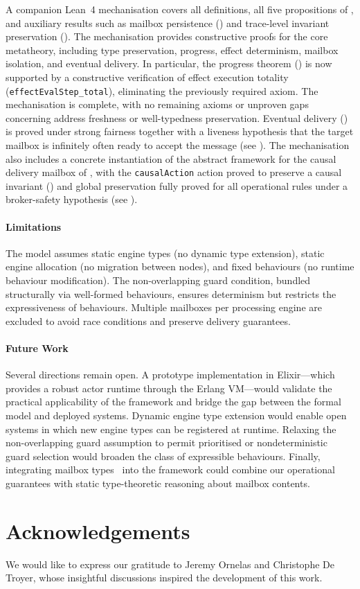 \documentclass[
  a4paper,        %
  techreport,     %
]{art}
\begin{document}
A companion Lean~4 mechanisation covers all definitions, all five
propositions of , and auxiliary results such as
mailbox persistence () and trace-level
invariant preservation ().
The mechanisation provides constructive proofs for the core metatheory,
including type preservation, progress, effect determinism, mailbox isolation,
and eventual delivery.
In particular, the progress theorem () is now supported
by a constructive verification of effect execution totality
(\texttt{effectEvalStep\_total}), eliminating the previously required axiom.
The mechanisation is complete, with no remaining axioms or unproven gaps
concerning address freshness or well-typedness preservation.
Eventual delivery () is proved under
strong fairness together with a liveness hypothesis that the target
mailbox is infinitely often ready to accept the message
(see ).
The mechanisation also includes a concrete instantiation of the
abstract framework for the causal delivery mailbox of
, with the \texttt{causalAction} action
proved to preserve a causal invariant ()
and global preservation fully proved for all operational rules under a
broker-safety hypothesis (see ).

\paragraph{Limitations}
The model assumes static engine types (no dynamic type extension), static
engine allocation (no migration between nodes), and fixed behaviours (no
runtime behaviour modification). The non-overlapping guard condition, bundled
structurally via well-formed behaviours, ensures determinism but restricts the
expressiveness of behaviours. Multiple
mailboxes per processing engine are excluded to avoid race conditions and
preserve delivery guarantees.

\paragraph{Future Work}
Several directions remain open. A prototype implementation in Elixir---which
provides a robust actor runtime through the Erlang VM---would validate the
practical applicability of the framework and bridge the gap between the formal
model and deployed systems. Dynamic engine type extension would enable open
systems in which new engine types can be registered at runtime. Relaxing the
non-overlapping guard assumption to permit prioritised or nondeterministic
guard selection would broaden the class of expressible behaviours. Finally,
integrating mailbox types~\cite{special-delivery-mailbox-types-2023} into the
framework could combine our operational guarantees with static type-theoretic
reasoning about mailbox contents.

\section{Acknowledgements}

We would like to express our gratitude to Jeremy Ornelas and Christophe De
Troyer, whose insightful discussions inspired the development of this work.


\end{document}
